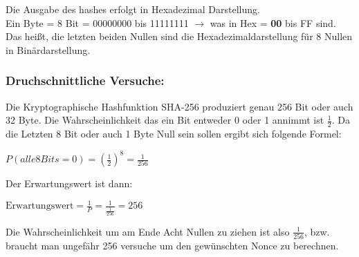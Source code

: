 Die Ausgabe des hashes erfolgt in Hexadezimal Darstellung.\\
Ein Byte = 8 Bit = 00000000 bis 11111111 $\rightarrow$ was in Hex = \textbf{00} bis FF sind.  Das heißt, die letzten beiden Nullen sind die Hexadezimaldarstellung für 8 Nullen in Binärdarstellung.

\subsubsection*{Druchschnittliche Versuche:}

Die Kryptographische Hashfunktion SHA-256 produziert genau 256 Bit oder auch 32 Byte. Die Wahrscheinlichkeit das ein Bit entweder 0 oder 1 annimmt ist $\frac{1}{2}$. Da die Letzten 8 Bit oder auch 1 Byte Null sein sollen ergibt sich folgende Formel:\\

\begin{center}
$P(alle 8 Bits = 0)=(\frac{1}{2})^8 = \frac{1}{256}$
\end{center}

Der Erwartungswert ist dann:

\begin{center}
$\text{Erwartungswert}=\frac{1}{P}= \frac{1}{\frac{1}{256}} = 256$
\end{center}

Die Wahrscheinlichkeit um am Ende Acht Nullen zu ziehen ist also $\frac{1}{256}$, bzw. braucht man ungefähr 256 versuche um den gewünschten Nonce zu berechnen.